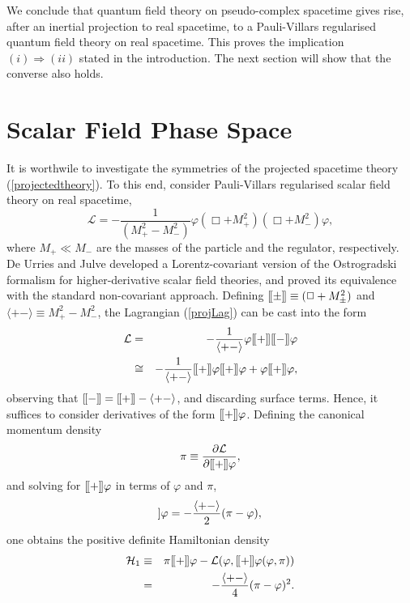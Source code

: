 \documentclass[a4paper,aps,prd,showkeys,showpacs,superscriptaddress,preprint]{revtex4}
\newcommand{\urries}[1]{[\hspace{-1pt}[ #1 ]\hspace{-1pt}]}
\newcommand{\julve}[2]{\langle #1 #2 \rangle}
\begin{document}
We conclude that quantum field theory on pseudo-complex spacetime
gives rise, after an inertial projection to real spacetime, to a
Pauli-Villars regularised quantum field theory on real spacetime. This
proves the implication $(i) \Rightarrow (ii)$ stated in the
introduction. The next section will show that the converse also holds. 

\section{Scalar Field Phase Space\label{sec_phasespace}}
It is worthwile to investigate the symmetries of the projected
spacetime theory (\ref{projectedtheory}). To this end, consider
Pauli-Villars regularised scalar field theory on real spacetime,
\begin{equation}\label{projLag}
  \mathcal{L} = - \frac{1}{(M_+^2 - M_-^2)}\varphi (\Box + M_+^2)(\Box + M_-^2) \varphi,
\end{equation}
where $M_+ \ll M_-$ are the masses of the particle and the
regulator, respectively.
De Urries and Julve \cite{deUrries:1998bi} developed a Lorentz-covariant version of
the Ostrogradski formalism for higher-derivative scalar field
theories, and proved its equivalence with the standard non-covariant
approach. Defining $\urries{\pm} \equiv (\Box + M_\pm^2)$ and $\julve{+}{-} \equiv
M_+^2 - M_-^2$, the Lagrangian (\ref{projLag}) can be cast into the
form
\begin{eqnarray}
  \mathcal{L} &=& - \frac{1}{{\julve{+}{-}}} \varphi \urries{+}\urries{-} \varphi\nonumber\\
   &\cong& - \frac{1}{{\julve{+}{-}}} \urries{+} \varphi \urries{+}
   \varphi + \varphi \urries{+} \varphi,
\end{eqnarray}
observing that $\urries{-} = \urries{+} - \julve{+}{-}$, and
discarding surface terms. Hence, it
suffices to consider derivatives of the form $\urries{+}\varphi$. 
Defining the canonical momentum density
\begin{equation}
  \pi \equiv \frac{\partial \mathcal{L}}{\partial \urries{+}\varphi}, 
\end{equation}
and solving for $\urries{+}\varphi$ in terms of $\varphi$ and $\pi$, 
\begin{equation}
  \urries{+}\varphi = - \frac{\julve{+}{-}}{2}(\pi - \varphi),
\end{equation}
one obtains the positive definite Hamiltonian density
\begin{eqnarray}\label{Hamdensity}
  \mathcal{H}_1 &\equiv& \pi \urries{+} \varphi - \mathcal{L}(\varphi,
  \urries{+}\varphi(\varphi, \pi))\nonumber\\
  &=& - \frac{\julve{+}{-}}{4} (\pi - \varphi)^2.
\end{eqnarray}
\end{document}
